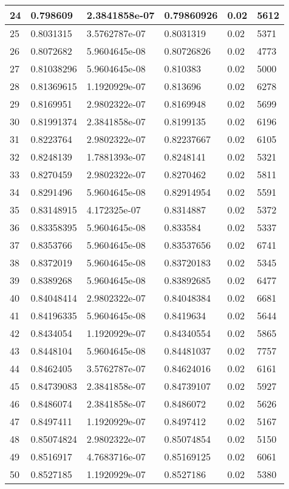 \begin{longtable}{|l|l|l|l|l|l|}
24 & 0.798609 & 2.3841858e-07 & 0.79860926 & 0.02 & 5612 \\ \hline 
25 & 0.8031315 & 3.5762787e-07 & 0.8031319 & 0.02 & 5371 \\ \hline 
26 & 0.8072682 & 5.9604645e-08 & 0.80726826 & 0.02 & 4773 \\ \hline 
27 & 0.81038296 & 5.9604645e-08 & 0.810383 & 0.02 & 5000 \\ \hline 
28 & 0.81369615 & 1.1920929e-07 & 0.813696 & 0.02 & 6278 \\ \hline 
29 & 0.8169951 & 2.9802322e-07 & 0.8169948 & 0.02 & 5699 \\ \hline 
30 & 0.81991374 & 2.3841858e-07 & 0.8199135 & 0.02 & 6196 \\ \hline 
31 & 0.8223764 & 2.9802322e-07 & 0.82237667 & 0.02 & 6105 \\ \hline 
32 & 0.8248139 & 1.7881393e-07 & 0.8248141 & 0.02 & 5321 \\ \hline 
33 & 0.8270459 & 2.9802322e-07 & 0.8270462 & 0.02 & 5811 \\ \hline 
34 & 0.8291496 & 5.9604645e-08 & 0.82914954 & 0.02 & 5591 \\ \hline 
35 & 0.83148915 & 4.172325e-07 & 0.8314887 & 0.02 & 5372 \\ \hline 
36 & 0.83358395 & 5.9604645e-08 & 0.833584 & 0.02 & 5337 \\ \hline 
37 & 0.8353766 & 5.9604645e-08 & 0.83537656 & 0.02 & 6741 \\ \hline 
38 & 0.8372019 & 5.9604645e-08 & 0.83720183 & 0.02 & 5345 \\ \hline 
39 & 0.8389268 & 5.9604645e-08 & 0.83892685 & 0.02 & 6477 \\ \hline 
40 & 0.84048414 & 2.9802322e-07 & 0.84048384 & 0.02 & 6681 \\ \hline 
41 & 0.84196335 & 5.9604645e-08 & 0.8419634 & 0.02 & 5644 \\ \hline 
42 & 0.8434054 & 1.1920929e-07 & 0.84340554 & 0.02 & 5865 \\ \hline 
43 & 0.8448104 & 5.9604645e-08 & 0.84481037 & 0.02 & 7757 \\ \hline 
44 & 0.8462405 & 3.5762787e-07 & 0.84624016 & 0.02 & 6161 \\ \hline 
45 & 0.84739083 & 2.3841858e-07 & 0.84739107 & 0.02 & 5927 \\ \hline 
46 & 0.8486074 & 2.3841858e-07 & 0.8486072 & 0.02 & 5626 \\ \hline 
47 & 0.8497411 & 1.1920929e-07 & 0.8497412 & 0.02 & 5167 \\ \hline 
48 & 0.85074824 & 2.9802322e-07 & 0.85074854 & 0.02 & 5150 \\ \hline 
49 & 0.8516917 & 4.7683716e-07 & 0.85169125 & 0.02 & 6061 \\ \hline 
50 & 0.8527185 & 1.1920929e-07 & 0.8527186 & 0.02 & 5380 \\ \hline 
\end{longtable}